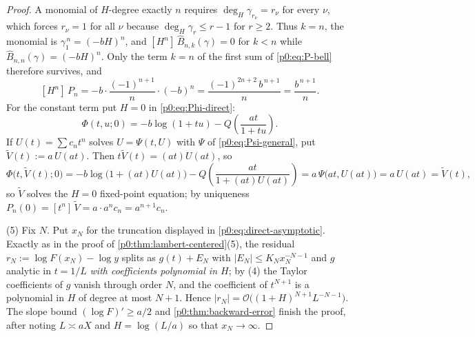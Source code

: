 \documentclass[11pt,a4paper,oneside]{book}
\theoremstyle{plain}
\theoremstyle{definition}
\theoremstyle{remark}
\newcommand{\Coef}[1]{[#1]\,}
\newcommand{\bigO}{\mathcal{O}}
\newcommand{\OB}{\widehat{B}}
\begin{document}
\begin{proof}
A monomial of $H$-degree exactly $n$ requires $\deg_H\gamma_{r_\nu}=r_\nu$ for
every $\nu$, which forces $r_\nu=1$ for all $\nu$ because
$\deg_H\gamma_r\le r-1$ for $r\ge2$.  Thus $k=n$, the monomial is
$\gamma_1^{\,n}=(-bH)^n$, and $\Coef{H^n}\OB_{n,k}(\gamma)=0$ for $k<n$ while
$\OB_{n,n}(\gamma)=(-bH)^n$.  Only the term $k=n$ of the first sum of
\eqref{p0:eq:P-bell} therefore survives, and
\[
 \Coef{H^n}P_n=-b\cdot\frac{(-1)^{n+1}}{n}\cdot(-b)^n
 =\frac{(-1)^{2n+2}\,b^{\,n+1}}{n}=\frac{b^{\,n+1}}{n}.
\]
For the constant term put $H=0$ in \eqref{p0:eq:Phi-direct}:
\[
 \Phi(t,u;0)=-b\log(1+tu)-Q\!\left(\frac{at}{1+tu}\right).
\]
If $U(t)=\sum c_nt^n$ solves $U=\Psi(t,U)$ with $\Psi$ of
\eqref{p0:eq:Psi-general}, put $\widetilde V(t):=a\,U(at)$.  Then
$t\widetilde V(t)=(at)U(at)$, so
\[
 \Phi\bigl(t,\widetilde V(t);0\bigr)
 =-b\log\bigl(1+(at)U(at)\bigr)-Q\!\left(\frac{at}{1+(at)U(at)}\right)
 =a\,\Psi\bigl(at,U(at)\bigr)=a\,U(at)=\widetilde V(t),
\]
so $\widetilde V$ solves the $H=0$ fixed-point equation; by uniqueness
$P_n(0)=\Coef{t^n}\widetilde V=a\cdot a^{n}c_n=a^{n+1}c_n$.

(5) Fix $N$.  Put $x_N$ for the truncation displayed in
\eqref{p0:eq:direct-asymptotic}.  Exactly as in the proof of
\cref{p0:thm:lambert-centered}(5), the residual
$r_N:=\log F(x_N)-\log y$ splits as $g(t)+E_N$ with
$|E_N|\le K_Nx_N^{-N-1}$ and $g$ analytic in $t=1/L$ \emph{with coefficients
polynomial in $H$}; by (4) the Taylor coefficients of $g$ vanish through order
$N$, and the coefficient of $t^{N+1}$ is a polynomial in $H$ of degree at most
$N+1$.  Hence $|r_N|=\bigO\bigl((1+H)^{N+1}L^{-N-1}\bigr)$.  The slope
bound $(\log F)'\ge a/2$ and \cref{p0:thm:backward-error} finish the proof,
after noting $L\asymp aX$ and $H=\log(L/a)$ so that $x_N\to\infty$.
\end{proof}
\end{document}
